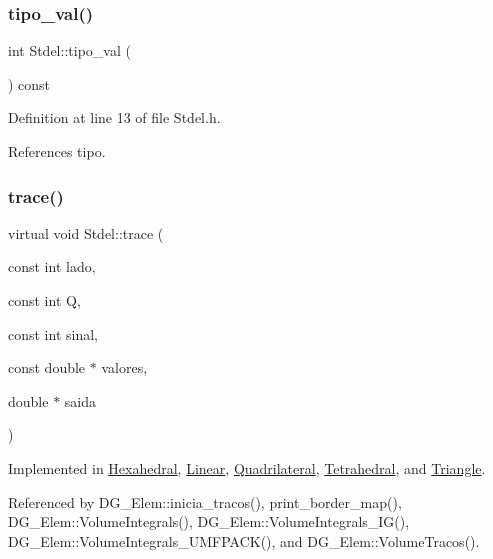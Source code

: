 \subsubsection{\texorpdfstring{tipo\+\_\+val()}{tipo\_val()}}
{\footnotesize\ttfamily int Stdel\+::tipo\+\_\+val (\begin{DoxyParamCaption}{ }\end{DoxyParamCaption}) const\hspace{0.3cm}{\ttfamily [inline]}}



Definition at line 13 of file Stdel.\+h.



References tipo.

\mbox{\label{classStdel_aeb2fe03bbd8af61e503e29d3dd5ae4f0}} 
\subsubsection{\texorpdfstring{trace()}{trace()}}
{\footnotesize\ttfamily virtual void Stdel\+::trace (\begin{DoxyParamCaption}\item[{const int}]{lado,  }\item[{const int}]{Q,  }\item[{const int}]{sinal,  }\item[{const double $\ast$}]{valores,  }\item[{double $\ast$}]{saida }\end{DoxyParamCaption})\hspace{0.3cm}{\ttfamily [pure virtual]}}



Implemented in \hyperlink{classHexahedral_a19ff3c9bf760964284ee86ad06c795d6}{Hexahedral}, \hyperlink{classLinear_abb5cb47b313459a6761d93c061d7f531}{Linear}, \hyperlink{classQuadrilateral_aaa950602df5656278e6a36863666c0c4}{Quadrilateral}, \hyperlink{classTetrahedral_af069ebbab2d2cc329ff5bc26ad914e4e}{Tetrahedral}, and \hyperlink{classTriangle_a1361a3e5ff11ed02786bf62325a2614f}{Triangle}.



Referenced by D\+G\+\_\+\+Elem\+::inicia\+\_\+tracos(), print\+\_\+border\+\_\+map(), D\+G\+\_\+\+Elem\+::\+Volume\+Integrals(), D\+G\+\_\+\+Elem\+::\+Volume\+Integrals\+\_\+\+I\+G(), D\+G\+\_\+\+Elem\+::\+Volume\+Integrals\+\_\+\+U\+M\+F\+P\+A\+C\+K(), and D\+G\+\_\+\+Elem\+::\+Volume\+Tracos().

